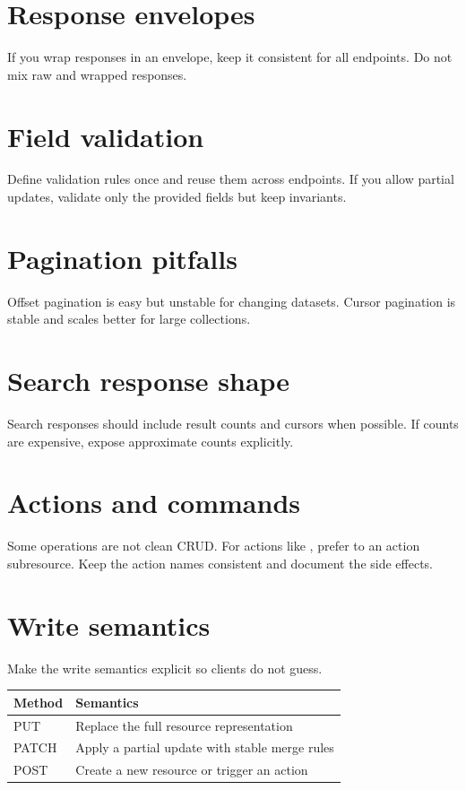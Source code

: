 \section{Response envelopes}
If you wrap responses in an envelope, keep it consistent for all endpoints.
Do not mix raw and wrapped responses.

\section{Field validation}
Define validation rules once and reuse them across endpoints.
If you allow partial updates, validate only the provided fields but keep invariants.

\section{Pagination pitfalls}
Offset pagination is easy but unstable for changing datasets.
Cursor pagination is stable and scales better for large collections.

\section{Search response shape}
Search responses should include result counts and cursors when possible.
If counts are expensive, expose approximate counts explicitly.

\section{Actions and commands}
Some operations are not clean CRUD.
For actions like , prefer  to an action subresource.
Keep the action names consistent and document the side effects.

\section{Write semantics}
Make the write semantics explicit so clients do not guess.

\begin{tabularx}{\textwidth}{@{}lX@{}}
\toprule
Method & Semantics \\
\midrule
PUT & Replace the full resource representation \\
PATCH & Apply a partial update with stable merge rules \\
POST & Create a new resource or trigger an action \\
\bottomrule
\end{tabularx}

